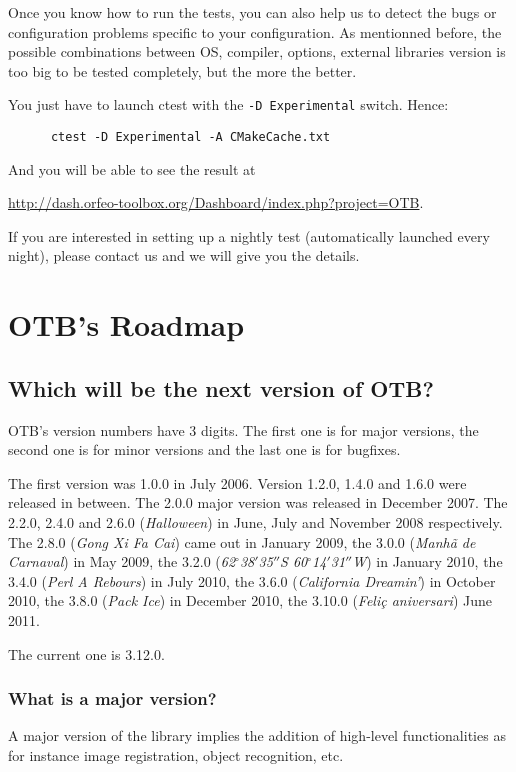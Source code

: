 Once you know how to run the tests, you can also help us to detect the bugs or configuration problems specific to your configuration. As mentionned before, the possible combinations between OS, compiler, options, external libraries version is too big to be tested completely, but the more the better.

You just have to launch ctest with the \texttt{-D Experimental} switch. Hence:
\begin{verbatim}
      ctest -D Experimental -A CMakeCache.txt
\end{verbatim}

And you will be able to see the result at

\url{http://dash.orfeo-toolbox.org/Dashboard/index.php?project=OTB}.

If you are interested in setting up a nightly test (automatically launched every night), please contact us and we will give you the details.

\section{OTB's Roadmap}

\subsection{Which will be the next version of OTB?}
OTB's version numbers have 3 digits. The first one is for major
versions, the second one is for minor versions and the last one is for
bugfixes.

The first version was 1.0.0 in July 2006. Version 1.2.0, 1.4.0 and 1.6.0 were
released in between. The 2.0.0 major version  was released in December 2007.
The 2.2.0, 2.4.0 and 2.6.0 ({\em Halloween}) in June, July and November 2008 respectively. The
2.8.0 ({\em Gong Xi Fa Cai}) came out in January 2009, the 3.0.0 ({\em Manh\~{a} de Carnaval}) in May 2009, the 3.2.0 ({\em 62$^\circ$38${'}$35${''}$S 60$^\circ$14${'}$31${''}$W}) in January 2010, the 3.4.0 ({\em Perl A Rebours}) in July 2010, the 3.6.0 ({\em California Dreamin'}) in October 2010, the 3.8.0 ({\em Pack Ice}) in December 2010, the 3.10.0 ({\em Feli\c{c} aniversari}) June 2011.

The current one is 3.12.0.

\subsubsection{What is a major version?}
A major version of the library implies the addition of high-level
functionalities as for instance image registration, object recognition, etc.

